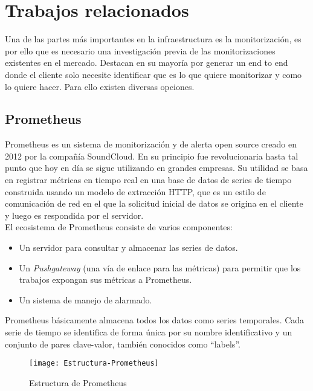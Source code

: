\documentclass[ spanish, a4paper, 12pt, oneside]{report}
\begin{document}
\section{Trabajos relacionados}

Una de las partes más importantes en la infraestructura es la monitorización, es por ello que es necesario una investigación previa de las monitorizaciones existentes en el mercado. Destacan en su mayoría por generar un end to end donde el cliente solo necesite 
identificar que es lo que quiere monitorizar y como lo quiere hacer. Para ello existen diversas opciones.

\subsection{Prometheus}

Prometheus es un sistema de monitorización y de alerta open source creado en 2012 por la compañía SoundCloud. En su principio fue revolucionaria hasta tal punto que hoy en día se sigue utilizando en grandes empresas. Su utilidad se basa en registrar métricas en tiempo 
real en una base de datos de series de tiempo construida usando un modelo de extracción HTTP, que es un estilo de comunicación de red en el que la solicitud inicial de datos se origina en el cliente y luego es respondida por el servidor. \\

El ecosistema de Prometheus consiste de varios componentes:

\begin{itemize}
   \item Un servidor para consultar y almacenar las series de datos.
   \item Un \textit{Pushgateway} (una vía de enlace para las métricas) para permitir que los trabajos expongan sus métricas a Prometheus.
   \item Un sistema de manejo de alarmado. 
\end{itemize}

Prometheus básicamente almacena todos los datos como series temporales. Cada serie de tiempo se identifica de forma única por su nombre identificativo y un conjunto de pares clave-valor, también conocidos como ``labels''. \\

\begin{figure}[!h]
   \centering
   \texttt{[image: Estructura-Prometheus]}\\
      \caption{\label{fig: Estructura de Prometheus} Estructura de Prometheus}
\end{figure}
\end{document}
